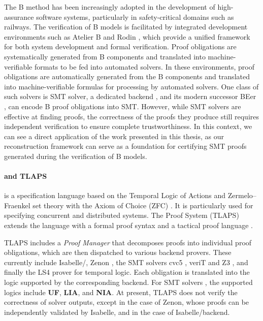 The B method \cite{Bmethod} has been increasingly adopted in the development of high-assurance software systems, particularly in safety-critical domains such as railways.
The verification of B models is facilitated by integrated development environments such as Atelier B \cite{AtelierB} and Rodin \cite{AbrialRodin}, which provide a unified framework for both system development and formal verification.
Proof obligations are systematically generated from B components and translated into machine-verifiable formats to be fed into automated solvers. 
In these environments, proof obligations are automatically generated from the B components and translated into machine-verifiable formulas for processing by automated solvers.
One class of such solvers is SMT solver, a dedicated backend \cite{DeharbeBSMT}, and its modern successor BEer \cite{Beer}, can encode B proof obligations into SMT.
However, while SMT solvers are effective at finding proofs, the correctness of the proofs they produce still requires independent verification to ensure complete trustworthiness.
In this context, we can see a direct application of the work presented in this thesis, as our reconstruction framework can serve as a foundation for certifying SMT proofs generated during the verification of B models.

\paragraph{\tlaplus and TLAPS}

\tlaplus is a specification language based on the Temporal Logic of Actions and Zermelo–Fraenkel set theory with the Axiom of Choice (ZFC) \cite{tlabook,tla-ref}.
It is particularly used for specifying concurrent and distributed systems.
The \tlaplus Proof System (TLAPS) extends the language with a formal proof syntax and a tactical proof language \cite{tla-proofs}.

TLAPS includes a \emph{Proof Manager} that decomposes proofs into individual proof obligations, which are then dispatched to various backend provers.
These currently include Isabelle/\tlaplus \cite{isabelle-hol-ref}, Zenon \cite{zenonmodulo},
the SMT solvers cvc5 \cite{cvc5}, veriT \cite{verit} and Z3 \cite{z3}, and finally the LS4 prover for temporal logic.
Each obligation is translated into the logic supported by the corresponding backend.
For SMT solvers \cite{new-encoding-tlaps}, the supported logics include \textbf{UF}, \textbf{LIA}, and \textbf{NIA}.
At present, TLAPS does not verify the correctness of solver outputs, except in the case of Zenon, whose proofs can be independently validated by Isabelle,
and in the case of Isabelle/\tlaplus backend.


